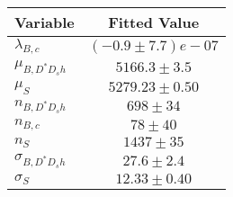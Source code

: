 \begin{tabular}[t]{lc}
\hline
Variable &Fitted Value\\
\hline\hline
$\lambda_{B,c}$&$(-0.9\pm7.7)e-07$\\
\hline
$\mu_{B, D^* D_s h}$&$5166.3\pm3.5$\\
\hline
$\mu_S$&$5279.23\pm0.50$\\
\hline
$n_{B, D^* D_s h}$&$698\pm34$\\
\hline
$n_{B,c}$&$78\pm40$\\
\hline
$n_S$&$1437\pm35$\\
\hline
$\sigma_{B, D^* D_s h}$&$27.6\pm2.4$\\
\hline
$\sigma_S$&$12.33\pm0.40$\\
\hline
\end{tabular}